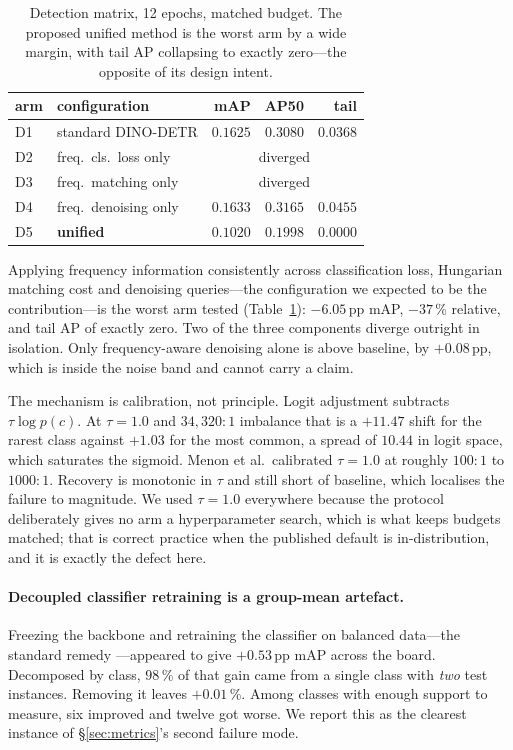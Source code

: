 \documentclass[10pt,twocolumn,letterpaper]{article}
\begin{document}
\begin{table}[t]\centering\small
\begin{tabular}{llrrr}
\toprule
arm & configuration & mAP & AP50 & tail \\
\midrule
D1 & standard DINO-DETR & $0.1625$ & $0.3080$ & $0.0368$ \\
D2 & freq.\ cls.\ loss only & \multicolumn{3}{c}{diverged} \\
D3 & freq.\ matching only & \multicolumn{3}{c}{diverged} \\
D4 & freq.\ denoising only & $0.1633$ & $0.3165$ & $0.0455$ \\
D5 & \textbf{unified} & $\mathbf{0.1020}$ & $0.1998$ & $\mathbf{0.0000}$ \\
\bottomrule
\end{tabular}
\caption{Detection matrix, 12 epochs, matched budget. The proposed unified
method is the worst arm by a wide margin, with tail AP collapsing to exactly
zero---the opposite of its design intent.}
\label{tab:det}
\end{table}

Applying frequency information consistently across classification loss, Hungarian
matching cost and denoising queries---the configuration we expected to be the
contribution---is the worst arm tested (Table~\ref{tab:det}): $-6.05$\,pp mAP,
$-37$\,\% relative, and tail AP of exactly zero. Two of the three components
diverge outright in isolation. Only frequency-aware denoising alone is above
baseline, by $+0.08$\,pp, which is inside the noise band and cannot carry a claim.

The mechanism is calibration, not principle. Logit adjustment subtracts
$\tau\log p(c)$. At $\tau=1.0$ and $34{,}320{:}1$ imbalance that is a $+11.47$
shift for the rarest class against $+1.03$ for the most common, a spread of
$10.44$ in logit space, which saturates the sigmoid. Menon et al.\ calibrated
$\tau=1.0$ at roughly $100{:}1$ to $1000{:}1$. Recovery is monotonic in $\tau$ and
still short of baseline, which localises the failure to magnitude. We used
$\tau=1.0$ everywhere because the protocol deliberately gives no arm a
hyperparameter search, which is what keeps budgets matched; that is correct
practice when the published default is in-distribution, and it is exactly the
defect here.

\paragraph{Decoupled classifier retraining is a group-mean artefact.} Freezing the
backbone and retraining the classifier on balanced data---the standard remedy
\cite{kang2020decoupling}---appeared to give $+0.53$\,pp mAP across the board. Decomposed by
class, $98$\,\% of that gain came from a single class with \emph{two} test
instances. Removing it leaves $+0.01$\,\%. Among classes with enough support to
measure, six improved and twelve got worse. We report this as the clearest
instance of \S\ref{sec:metrics}'s second failure mode.
\end{document}
